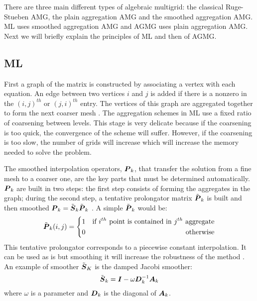 There are three main different types of algebraic multigrid: the classical 
Ruge-Stueben AMG, the plain aggregation AMG and the
smoothed aggregation AMG. ML uses smoothed aggregation AMG and AGMG
uses plain aggregation AMG. Next we will briefly explain the principles of ML
and then of AGMG.

\subsection{ML}
First a graph of the matrix is constructed by associating a vertex with each
equation. An edge between two vertices $i$ and $j$ is added if there is a
nonzero in the $(i,j)^{th}$ or $(j,i)^{th}$ entry. The vertices of this
graph are aggregated together to form the next coarser mesh \cite{ml_guide}. 
The aggregation schemes in ML use a fixed ratio of coarsening between levels. 
This stage is very delicate because if the coarsening is too quick, the convergence 
of the scheme will suffer. However, if the coarsening is too slow, the number
of grids will increase which will increase the memory needed to solve the problem.

The smoothed interpolation operators, $\boldsymbol{P}_k$, that transfer the solution from a 
fine mesh to a coarser one, are the key parts that must be determined 
automatically. $\boldsymbol{P}_k$ are built in two steps: the first step consists of
forming the aggregates in the graph; during the second step, a tentative 
prolongator matrix $\tilde{\boldsymbol{P}}_k$ is built and then smoothed $\boldsymbol{P}_k =
\tilde{\boldsymbol{S}}_k \tilde{\boldsymbol{P}}_k$ \cite{mis}. A simple $\tilde{\boldsymbol{P}}_k$ 
would be:
\begin{equation}
\tilde{\boldsymbol{P}}_k(i,j) = \left\{
\begin{aligned}
&1 &\textrm{if }i^{th}\textrm{ point is contained in }j^{th}\textrm{
  aggregate}\\
& 0 &\textrm{otherwise}
\end{aligned}
\right.
\end{equation}
This tentative prolongator corresponds to a piecewise constant interpolation.
It can be used as is but smoothing it will increase the robustness of the method
\cite{mis}. An example of smoother $\tilde{\boldsymbol{S}}_K$ is the damped Jacobi
smoother:
\begin{equation}
\tilde{\boldsymbol{S}}_k = \boldsymbol{I} - \omega \boldsymbol{D}_k^{-1} \boldsymbol{A}_k
\end{equation}
where $\omega$ is a parameter and $\boldsymbol{D}_k$ is the diagonal of $\boldsymbol{A}_k$.

